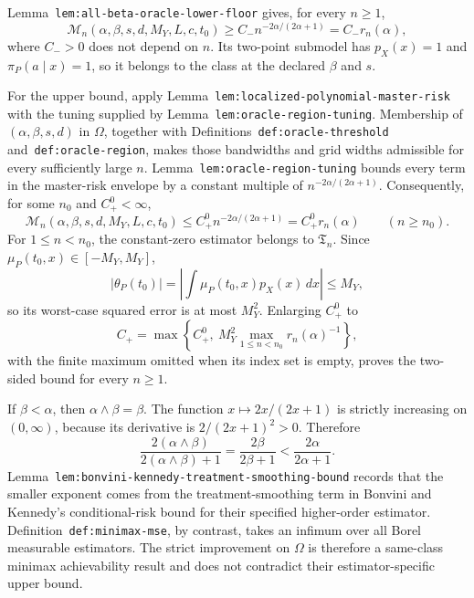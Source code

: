 Lemma~\texttt{lem:all-beta-oracle-lower-floor} gives, for every \(n\ge1\),
\[
\mathcal M_n(\alpha,\beta,s,d,M_Y,L,c,t_0)
\ge C_-n^{-2\alpha/(2\alpha+1)}=C_-r_n(\alpha),
\]
where \(C_->0\) does not depend on \(n\). Its two-point submodel has \(p_X(x)=1\) and \(\pi_P(a\mid x)=1\), so it belongs to the class at the declared \(\beta\) and \(s\).

For the upper bound, apply Lemma~\texttt{lem:localized-polynomial-master-risk} with the tuning supplied by Lemma~\texttt{lem:oracle-region-tuning}. Membership of \((\alpha,\beta,s,d)\) in \(\Omega\), together with Definitions~\texttt{def:oracle-threshold} and~\texttt{def:oracle-region}, makes those bandwidths and grid widths admissible for every sufficiently large \(n\). Lemma~\texttt{lem:oracle-region-tuning} bounds every term in the master-risk envelope by a constant multiple of \(n^{-2\alpha/(2\alpha+1)}\). Consequently, for some \(n_0\) and \(C_+^0<\infty\),
\[
\mathcal M_n(\alpha,\beta,s,d,M_Y,L,c,t_0)
\le C_+^0n^{-2\alpha/(2\alpha+1)}=C_+^0r_n(\alpha)
\qquad(n\ge n_0).
\]
For \(1\le n<n_0\), the constant-zero estimator belongs to \(\mathfrak T_n\). Since \(\mu_P(t_0,x)\in[-M_Y,M_Y]\),
\[
\lvert\theta_P(t_0)\rvert
=\left\lvert\int\mu_P(t_0,x)p_X(x)\,dx\right\rvert\le M_Y,
\]
so its worst-case squared error is at most \(M_Y^2\). Enlarging \(C_+^0\) to
\[
C_+=\max\left\{C_+^0,\ M_Y^2\max_{1\le n<n_0}r_n(\alpha)^{-1}\right\},
\]
with the finite maximum omitted when its index set is empty, proves the two-sided bound for every \(n\ge1\).

If \(\beta<\alpha\), then \(\alpha\wedge\beta=\beta\). The function \(x\mapsto2x/(2x+1)\) is strictly increasing on \((0,\infty)\), because its derivative is \(2/(2x+1)^2>0\). Therefore
\[
\frac{2(\alpha\wedge\beta)}{2(\alpha\wedge\beta)+1}
=\frac{2\beta}{2\beta+1}
<\frac{2\alpha}{2\alpha+1}.
\]
Lemma~\texttt{lem:bonvini-kennedy-treatment-smoothing-bound} records that the smaller exponent comes from the treatment-smoothing term in Bonvini and Kennedy's conditional-risk bound for their specified higher-order estimator. Definition~\texttt{def:minimax-mse}, by contrast, takes an infimum over all Borel measurable estimators. The strict improvement on \(\Omega\) is therefore a same-class minimax achievability result and does not contradict their estimator-specific upper bound.